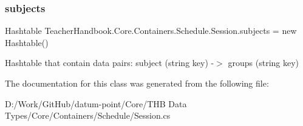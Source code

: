 \subsubsection{\texorpdfstring{subjects}{subjects}}
{\footnotesize\ttfamily Hashtable Teacher\+Handbook.\+Core.\+Containers.\+Schedule.\+Session.\+subjects = new Hashtable()}



Hashtable that contain data pairs\+: subject (string key) -\/$>$ groups (string key) 



The documentation for this class was generated from the following file\+:\begin{DoxyCompactItemize}
\item 
D\+:/\+Work/\+Git\+Hub/datum-\/point/\+Core/\+T\+H\+B Data Types/\+Core/\+Containers/\+Schedule/Session.\+cs\end{DoxyCompactItemize}
